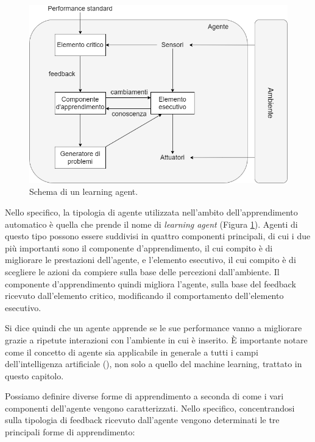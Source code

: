 \documentclass[../../main.tex]{subfiles}
\begin{document}
    \begin{figure}[H]
        \centering
        \includegraphics[width =\textwidth]{immagini/4_0/learning_agent.png}
        \caption{Schema di un learning agent.}
        \label{fig:learning_agent}
    \end{figure}

    Nello specifico, la tipologia di agente utilizzata nell'ambito dell'apprendimento automatico è quella che prende il nome di \textit{learning agent} (Figura \ref{fig:learning_agent}). Agenti di questo tipo possono essere suddivisi in quattro componenti principali, di cui i due più importanti sono il componente d'apprendimento, il cui compito è di migliorare le prestazioni dell'agente, e l'elemento esecutivo, il cui compito è di scegliere le azioni da compiere sulla base delle percezioni dall'ambiente. Il componente d'apprendimento quindi migliora l'agente, sulla base del feedback ricevuto dall'elemento critico, modificando il comportamento dell'elemento esecutivo.

    Si dice quindi che un agente apprende se le sue performance vanno a migliorare grazie a ripetute interazioni con l'ambiente in cui è inserito.
    È importante notare come il concetto di agente sia applicabile in generale a tutti i campi dell'intelligenza artificiale (\cite{russel2010}), non solo a quello del machine learning, trattato in questo capitolo.

    Possiamo definire diverse forme di apprendimento a seconda di come i vari componenti dell'agente vengono caratterizzati. Nello specifico, concentrandosi sulla tipologia di feedback ricevuto dall'agente vengono determinati le tre principali forme di apprendimento:
    
\end{document}
